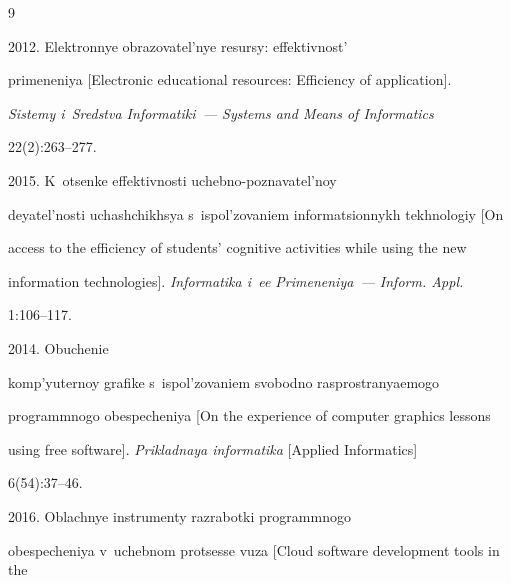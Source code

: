 \renewcommand{\bibname}{\protect\rmfamily References}







{\small\frenchspacing


{%




\begin{thebibliography}{9}


  




 2012. Elektronnye obrazovatel'nye resursy: effektivnost' 


primeneniya [Electronic educational resources: Efficiency of application]. 


\textit{Sistemy i~Sredstva Informatiki~--- Systems and Means of Informatics}  


22(2):263--277.




 2015. K~otsenke effektivnosti uchebno-poznavatel'noy 


deyatel'nosti uchashchikhsya s~ispol'zovaniem informatsionnykh tekhnologiy [On 


access to the efficiency of students' cognitive activities while using the new 


information technologies]. \textit{Informatika i~ee Primeneniya~--- Inform. Appl.} 


1:106--117.







 2014. Obuchenie 


komp'yuternoy grafike s~ispol'zovaniem svobodno rasprostranyaemogo 


programmnogo obespecheniya [On the experience of computer graphics lessons 


using free software]. \textit{Prikladnaya informatika} [Applied Informatics] 


6(54):37--46.




 2016. Oblachnye instrumenty razrabotki programmnogo 


obespecheniya v~uchebnom protsesse vuza [Cloud software development tools in the 



\end{thebibliography}}}
